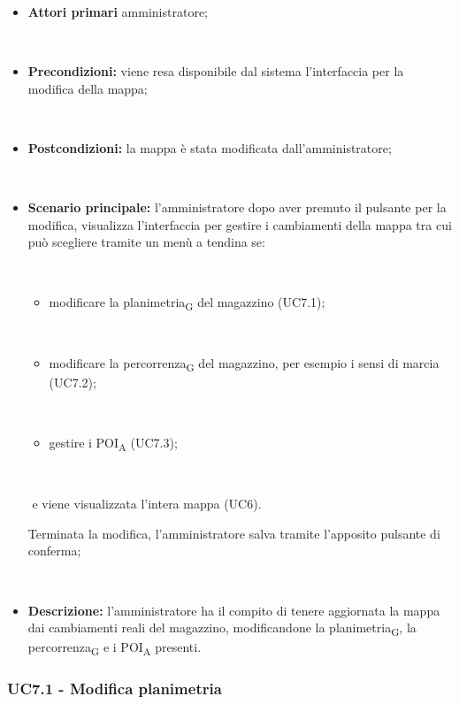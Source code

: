 \begin{itemize}

​    \item   \textbf{Attori primari} amministratore;

​    \item   \textbf{Precondizioni:} viene resa disponibile dal sistema l'interfaccia per la modifica della mappa;

​    \item   \textbf{Postcondizioni:} la mappa è stata modificata dall'amministratore;

​    \item   \textbf{Scenario principale:} l'amministratore dopo aver premuto il pulsante per la modifica, visualizza l'interfaccia per gestire i cambiamenti della mappa tra cui può scegliere tramite un menù a tendina se:

​    \begin{itemize}

​        \item modificare la planimetria\textsubscript{G} del magazzino (UC7.1);

​        \item modificare la percorrenza\textsubscript{G} del magazzino, per esempio i sensi di marcia (UC7.2);

​        \item gestire i POI\textsubscript{A} (UC7.3);

​    \end{itemize}

​    e viene visualizzata l'intera mappa (UC6).

Terminata la modifica, l'amministratore salva tramite l'apposito pulsante di conferma;

​    \item   \textbf{Descrizione:} l'amministratore ha il compito di tenere aggiornata la mappa dai cambiamenti reali del magazzino, modificandone la planimetria\textsubscript{G}, la percorrenza\textsubscript{G} e i POI\textsubscript{A} presenti.

\end{itemize}





\subsubsection{UC7.1 - Modifica planimetria}

